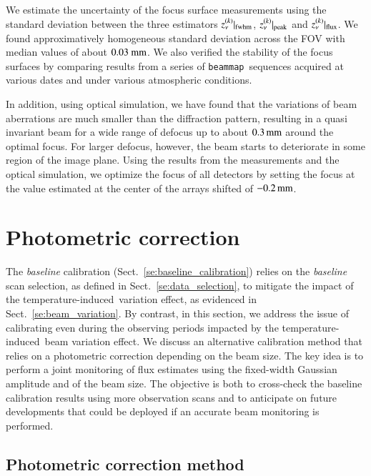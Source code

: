 \documentclass[traditionalabstract]{aa}
\newcommand{\bm}{{\tt beammap}}
\newcommand{\afternoon}{temperature-induced}
\newcommand{\lp}[1]{#1}
\begin{document}
\begin{appendix}
We estimate the uncertainty of the focus
surface measurements using the standard deviation between the three
estimators $z_\nu^{(k)}|_{\rm{fwhm}}$, $z_\nu^{(k)}|_{\rm{peak}}$ and
$z_\nu^{(k)}|_{\rm{flux}}$. We found approximatively homogeneous
standard deviation across the FOV with median values of about
$0.03~\rm{mm}$. We also verified the stability of the focus surfaces by comparing
results from a series of \bm\ sequences acquired at various dates and
under various atmospheric conditions.

{\lp In addition, using optical simulation, we have found that the
variations of beam aberrations are much smaller than the
diffraction pattern, resulting in a quasi invariant beam for a
wide range of defocus up to about $0.3\, \rm{mm}$ around the optimal
focus. For larger defocus, however, the beam starts to deteriorate in
some region of the image plane.}
{\lp Using the results from the measurements and the optical
simulation, we optimize the focus of all detectors by setting the
focus at the value estimated at the center of the arrays shifted of
$-0.2\,\rm{mm}$.}


%
%
  \section{Photometric correction}
  \label{se:photometric_correction}
 

The \emph{baseline} calibration (Sect.~\ref{se:baseline_calibration}) relies on
the \emph{baseline} scan selection, as defined in
Sect.~\ref{se:data_selection}, to mitigate the impact of
the \afternoon\ variation effect, as evidenced in Sect.~\ref{se:beam_variation}.
By contrast, in this section, we
address the issue of calibrating even during the observing periods
impacted by the \afternoon\ beam variation effect. We discuss an
alternative calibration method that
relies on a photometric correction depending on the beam size.
{\lp The key idea is to perform a joint monitoring of flux estimates
  using the fixed-width Gaussian amplitude and of the beam size.}
The objective is both to cross-check the baseline calibration results
using more observation scans and to anticipate on future developments
that could be deployed if an accurate beam monitoring is performed.


\subsection{Photometric correction method}
\label{se:photometric_correction_method}


\end{appendix}
\end{document}
